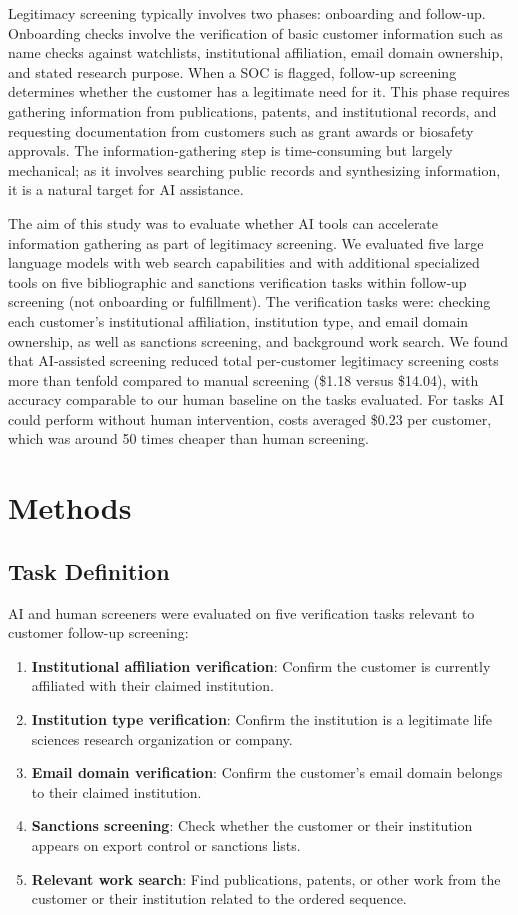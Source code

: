 \documentclass[utf8]{FrontiersinHarvard}
\begin{document}
Legitimacy screening typically involves two phases: onboarding and follow-up. Onboarding checks involve the verification of basic customer information such as name checks against watchlists, institutional affiliation, email domain ownership, and stated research purpose. When a SOC is flagged, follow-up screening determines whether the customer has a legitimate need for it. This phase requires gathering information from publications, patents, and institutional records, and requesting documentation from customers such as grant awards or biosafety approvals.
The information-gathering step is time-consuming but largely mechanical; as it involves searching public records and synthesizing information, it is a natural target for AI assistance.

The aim of this study was to evaluate whether AI tools can accelerate information gathering as part of legitimacy screening. We evaluated five large language models with web search capabilities and with additional specialized tools on five bibliographic and sanctions verification tasks within follow-up screening (not onboarding or fulfillment). The verification tasks were: checking each customer's institutional affiliation, institution type, and email domain ownership, as well as sanctions screening, and background work search. We found that AI-assisted screening reduced total per-customer legitimacy screening costs more than tenfold compared to manual screening (\$1.18 versus \$14.04), with accuracy comparable to our human baseline on the tasks evaluated. For tasks AI could perform without human intervention, costs averaged \$0.23 per customer, which was around 50 times cheaper than human screening.

\section{Methods}

\subsection{Task Definition}

AI and human screeners were evaluated on five verification tasks relevant to customer follow-up screening:

\begin{enumerate}
\item \textbf{Institutional affiliation verification}: Confirm the customer is currently affiliated with their claimed institution.
\item \textbf{Institution type verification}: Confirm the institution is a legitimate life sciences research organization or company.
\item \textbf{Email domain verification}: Confirm the customer's email domain belongs to their claimed institution.
\item \textbf{Sanctions screening}: Check whether the customer or their institution appears on export control or sanctions lists.
\item \textbf{Relevant work search}: Find publications, patents, or other work from the customer or their institution related to the ordered sequence.
\end{enumerate}
\end{document}
